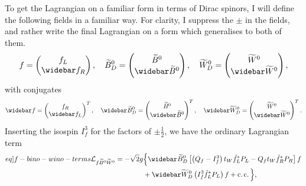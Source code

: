 \documentclass[english, notitlepage]{article}
\begin{document}
            To get the Lagrangian on a familiar form in terms of Dirac spinors, I will
            define the following fields in a familiar way. For clarity, I suppress the \(\pm\) in the fields, and rather write the final Lagrangian on a form which generalises to both of them.
            \begin{align}
                f = \begin{pmatrix}
                        f_L \\ \wbar{f}_R
                    \end{pmatrix},
                \quad
                \wtilde{B}^0_D = \begin{pmatrix}
                                     \wtilde{B}^0 \\ \wbar{\wtilde{B}}^0
                                 \end{pmatrix},
                \quad
                \wtilde{W}^0_D = \begin{pmatrix}
                                     \wtilde{W}^0 \\ \wbar{\wtilde{W}}^0
                                 \end{pmatrix},
            \end{align}
            with conjugates
            \begin{align}
                \wbar{f} = \begin{pmatrix}
                               f_R \\ \wbar{f}_L
                           \end{pmatrix}^T,
                \quad
                \wbar{\wtilde{B}}^0_D = \begin{pmatrix}
                                            \wtilde{B}^0 \\ \wbar{\wtilde{B}}^0
                                        \end{pmatrix}^T,
                \quad
                \wbar{\wtilde{W}}^0_D = \begin{pmatrix}
                                            \wtilde{W}^0 \\ \wbar{\wtilde{W}}^0
                                        \end{pmatrix}^T.
            \end{align}
            Inserting the isospin $I^3_f$ for the factors of $\pm\frac{1}{2}$, we have the ordinary Lagrangian term
            \begin{align}
                \label[eq]{f-bino-wino-terms}
                \nonumber
                \L_{f\bino\wino} = -\sqrt{2} g & \Big\{ \wbar{\wtilde{B}}^0_D \bclosed{ \pclosed{Q_f - I^3_f}t_W \tilde{f}_L^* P_L - Q_f t_W \tilde{f}_R^* P_R } f \\
                                               & + \wbar{\wtilde{W}}^0_D \pclosed{I^3_f \tilde{f}_L^* P_L} f + \cc \Big\},
            \end{align}
\end{document}
